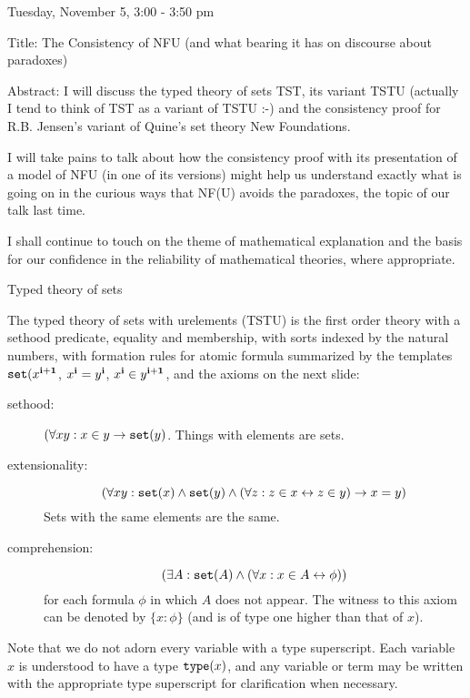 \documentclass{slides}
\begin{document}
\begin{slide}

Tuesday, November 5, 3:00 - 3:50 pm

 Title: The Consistency of NFU (and what bearing it has on discourse about paradoxes)


Abstract: I will discuss the typed theory of sets TST, its variant TSTU (actually I tend to think of TST as a variant of TSTU :-) and the consistency proof for R.B. Jensen's variant of Quine's set theory New Foundations.

I will take pains to talk about how the consistency proof with its presentation of a model of NFU (in one of its versions) might help us understand exactly what is going on in the curious ways that NF(U) avoids the paradoxes, the topic of our talk last time.

I shall continue to touch on the theme of mathematical explanation and the basis for our confidence in the reliability of mathematical theories, where appropriate.

\end{slide}

\begin{slide}

{\Large Typed theory of sets}

The typed theory of sets with urelements (TSTU) is the first order theory with a sethood predicate, equality and membership, with sorts indexed by the natural numbers, with formation rules for atomic formula summarized by the templates ${\tt set}(x^{\bf i+1}$, $x^{\bf i} = y^{\bf i}$, $x^{\bf i} \in y^{\bf i+1}$, and the axioms on the next slide:

\end{slide}

\begin{slide}

\begin{description}

\item[sethood:]  $(\forall xy:x \in y \rightarrow {\tt set}(y)$.  Things with elements are sets.

\item[extensionality:]  {\small $$(\forall xy: {\tt set}(x) \wedge {\tt set}(y) \wedge (\forall z:z \in x \leftrightarrow z \in y) \rightarrow x=y)$$}  Sets with the same elements are the same.

\item[comprehension:]  $$(\exists A:{\tt set}(A) \wedge (\forall x:x \in A \leftrightarrow \phi))$$ for each formula $\phi$ in which $A$ does not appear.  The witness to this axiom
can be denoted by $\{x:\phi\}$ (and is of type one higher than that of $x$).

\end{description}

Note that we do not adorn every variable with a type superscript.  Each variable $x$ is understood to have a type ${\tt type}(x)$, and any variable or term may be written with the appropriate type superscript for clarification when necessary.

\end{slide}
\end{document}
